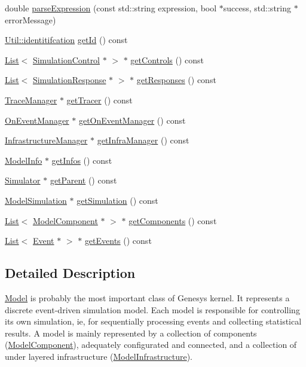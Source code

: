 \begin{DoxyCompactItemize}
double \hyperlink{class_model_a408ddfa761fcd04ec1211ae6c1526ab3}{parse\-Expression} (const std\-::string expression, bool $\ast$success, std\-::string $\ast$error\-Message)
\item 
\hyperlink{class_util_ad17d458d9344b10bba64347e514d6d71}{Util\-::identitifcation} \hyperlink{class_model_abfd7753d30de6abea64b3f0846e097eb}{get\-Id} () const 
\item 
\hyperlink{class_list}{List}$<$ \hyperlink{class_simulation_control}{Simulation\-Control} $\ast$ $>$ $\ast$ \hyperlink{class_model_a20c078a714fe7fba0f02ea1d50a19589}{get\-Controls} () const 
\item 
\hyperlink{class_list}{List}$<$ \hyperlink{class_simulation_response}{Simulation\-Response} $\ast$ $>$ $\ast$ \hyperlink{class_model_ad4caeecd30fd5eb67b46c232cfbea14b}{get\-Responses} () const 
\item 
\hyperlink{class_trace_manager}{Trace\-Manager} $\ast$ \hyperlink{class_model_adc0de22631d77864b7956591c39ebc60}{get\-Tracer} () const 
\item 
\hyperlink{class_on_event_manager}{On\-Event\-Manager} $\ast$ \hyperlink{class_model_afc9de1c6025e8332830b29958ede63a2}{get\-On\-Event\-Manager} () const 
\item 
\hyperlink{class_infrastructure_manager}{Infrastructure\-Manager} $\ast$ \hyperlink{class_model_a944c2b2dffd691d4aafc2d4028c02e6b}{get\-Infra\-Manager} () const 
\item 
\hyperlink{class_model_info}{Model\-Info} $\ast$ \hyperlink{class_model_ac0f1ea5fbbeba7a2992ee13516e7522f}{get\-Infos} () const 
\item 
\hyperlink{class_simulator}{Simulator} $\ast$ \hyperlink{class_model_a69ed4849ae7708a83ace16abb7251b20}{get\-Parent} () const 
\item 
\hyperlink{class_model_simulation}{Model\-Simulation} $\ast$ \hyperlink{class_model_a217487c8193eb6c0afd95a9315cd51bb}{get\-Simulation} () const 
\item 
\hyperlink{class_list}{List}$<$ \hyperlink{class_model_component}{Model\-Component} $\ast$ $>$ $\ast$ \hyperlink{class_model_ae5773d78fc47cb35be7fbeb74b7d63e4}{get\-Components} () const 
\item 
\hyperlink{class_list}{List}$<$ \hyperlink{class_event}{Event} $\ast$ $>$ $\ast$ \hyperlink{class_model_a841c78bda0eb27c652c6921094dc5921}{get\-Events} () const 
\end{DoxyCompactItemize}


\subsection{Detailed Description}
\hyperlink{class_model}{Model} is probably the most important class of Genesys kernel. It represents a discrete event-\/driven simulation model. Each model is responsible for controlling its own simulation, ie, for sequentially processing events and collecting statistical results. A model is mainly represented by a collection of components (\hyperlink{class_model_component}{Model\-Component}), adequately configurated and connected, and a collection of under layered infrastructure (\hyperlink{class_model_infrastructure}{Model\-Infrastructure}). 

